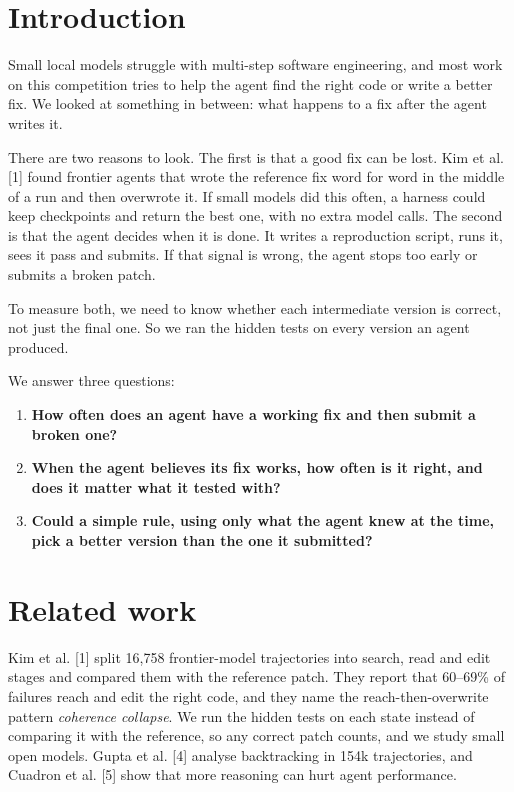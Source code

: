 \documentclass[10pt]{article}
\begin{document}
\section*{Introduction}
Small local models struggle with multi-step software engineering, and most work on this competition tries to help the agent find the right code or write a better fix. We looked at something in between: what happens to a fix after the agent writes it.

There are two reasons to look. The first is that a good fix can be lost. Kim et al. [1] found frontier agents that wrote the reference fix word for word in the middle of a run and then overwrote it. If small models did this often, a harness could keep checkpoints and return the best one, with no extra model calls. The second is that the agent decides when it is done. It writes a reproduction script, runs it, sees it pass and submits. If that signal is wrong, the agent stops too early or submits a broken patch.

To measure both, we need to know whether each intermediate version is correct, not just the final one. So we ran the hidden tests on every version an agent produced.

We answer three questions:

\begin{enumerate}\setlength\itemsep{2pt}\item \textbf{How often does an agent have a working fix and then submit a broken one?}\item \textbf{When the agent believes its fix works, how often is it right, and does it matter what it tested with?}\item \textbf{Could a simple rule, using only what the agent knew at the time, pick a better version than the one it submitted?}\end{enumerate}
\section*{Related work}
Kim et al. [1] split 16,758 frontier-model trajectories into search, read and edit stages and compared them with the reference patch. They report that 60--69\% of failures reach and edit the right code, and they name the reach-then-overwrite pattern \emph{coherence collapse}. We run the hidden tests on each state instead of comparing it with the reference, so any correct patch counts, and we study small open models. Gupta et al. [4] analyse backtracking in 154k trajectories, and Cuadron et al. [5] show that more reasoning can hurt agent performance.
\end{document}
